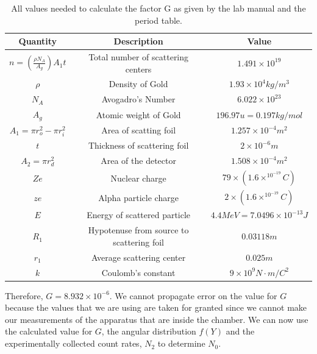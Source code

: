 \begin{table}[H]
\begin{center}
\begin{tabular}{|c|c|c|}\hline
Quantity & Description & Value\\ \hline
 $n=\left(\frac{\rho N_A}{A_g}\right)A_1 t$ & Total number of scattering centers& $1.491\times10^{19}$ \\ \hline
 $\rho$ & Density of Gold &$1.93\times10^4 kg/m^3$ \\ \hline
$N_A$ & Avogadro's Number &  $6.022\times10^{23}$\\ \hline
$A_g$ & Atomic weight of Gold & $196.97 u= 0.197 kg/mol$ \\ \hline
$A_1=\pi r_o^2-\pi r_i^2 $ & Area of scatting foil& $1.257\times10^{-4} m^2$ \\ \hline
 $t$ & Thickness of scattering foil & $2\times10^{-6} m$\\ \hline
$A_2=\pi r_d^2$ & Area of the detector & $1.508\times10^{-4}m^2$\\ \hline
$Ze$ & Nuclear charge &$79\times (1.6\times^10^{-19} C)$\\ \hline
$ze$ & Alpha particle charge & $2\times(1.6\times^10^{-19} C)$\\ \hline
$E$ & Energy of scattered particle &$4.4MeV=7.0496\times10^{-13}J$\\ \hline
$R_1$ & Hypotenuse from source to scattering foil& $0.03118m$\\ \hline
$r_1$ & Average scattering center & $0.025 m$ \\ \hline
$k$ & Coulomb's constant & $9\times10^9 N\cdot m/ C^2$\\ \hline

\end{tabular}
\caption{All values needed to calculate the factor G as given by the lab manual and the period table.}
\end{center}
\end{table}
Therefore, $G=8.932\times10^{-6}$. We cannot propagate error on the value for $G$ because the values that we are using are taken for granted since we cannot make our measurements of the apparatus that are inside the chamber. We can now use the calculated value for $G$, the angular distribution $f(Y)$ and the experimentally collected count rates, $N_2$ to determine $N_0$. 

